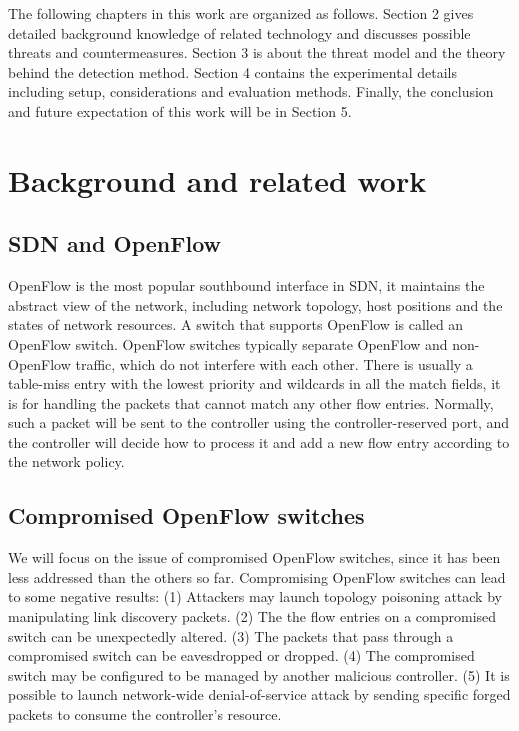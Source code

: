 \documentclass[conference]{IEEEtran}
\begin{document}
The following chapters in this work are organized as follows. Section 2 gives detailed background knowledge of related technology and discusses possible threats and countermeasures. Section 3 is about the threat model and the theory behind the detection method. Section 4 contains the experimental details including setup, considerations and evaluation methods. Finally, the conclusion and future expectation of this work will be in Section 5.

\section{Background and related work}
\subsection{SDN and OpenFlow}
\label{SDN and OpenFlow}
OpenFlow is the most popular southbound interface in SDN, it maintains the abstract view of the network, including network topology, host positions and the states of network resources. A switch that supports OpenFlow is called an OpenFlow switch. OpenFlow switches typically separate OpenFlow and non-OpenFlow traffic, which do not interfere with each other. There is usually a table-miss entry with the lowest priority and wildcards in all the match fields, it is for handling the packets that cannot match any other flow entries. Normally, such a packet will be sent to the controller using the controller-reserved port, and the controller will decide how to process it and add a new flow entry according to the network policy. 

\subsection{Compromised OpenFlow switches}
\label{SDN security}
We will focus on the issue of compromised OpenFlow switches, since it has been less addressed than the others so far. Compromising OpenFlow switches can lead to some negative results: (1) Attackers may launch topology poisoning attack by manipulating link discovery packets. (2) The the flow entries on a compromised switch can be unexpectedly altered. (3) The packets that pass through a compromised switch can be eavesdropped or dropped. (4) The compromised switch may be configured to be managed by another malicious controller. (5) It is possible to launch network-wide denial-of-service attack by sending specific forged packets to consume the controller's resource. 
\end{document}
